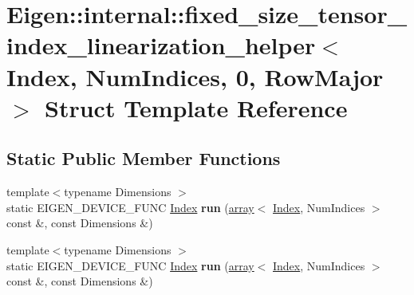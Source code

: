 \hypertarget{struct_eigen_1_1internal_1_1fixed__size__tensor__index__linearization__helper_3_01_index_00_01_n48be286421c8b3a07bb17ebfc895db83}{}\section{Eigen\+:\+:internal\+:\+:fixed\+\_\+size\+\_\+tensor\+\_\+index\+\_\+linearization\+\_\+helper$<$ Index, Num\+Indices, 0, Row\+Major $>$ Struct Template Reference}
\label{struct_eigen_1_1internal_1_1fixed__size__tensor__index__linearization__helper_3_01_index_00_01_n48be286421c8b3a07bb17ebfc895db83}
\subsection*{Static Public Member Functions}
\begin{DoxyCompactItemize}
\item 
\mbox{\label{struct_eigen_1_1internal_1_1fixed__size__tensor__index__linearization__helper_3_01_index_00_01_n48be286421c8b3a07bb17ebfc895db83_ab3589826fdcd68e98a31708d12753a07}} 
{\footnotesize template$<$typename Dimensions $>$ }\\static E\+I\+G\+E\+N\+\_\+\+D\+E\+V\+I\+C\+E\+\_\+\+F\+U\+NC \hyperlink{namespace_eigen_a62e77e0933482dafde8fe197d9a2cfde}{Index} {\bfseries run} (\hyperlink{class_eigen_1_1array}{array}$<$ \hyperlink{namespace_eigen_a62e77e0933482dafde8fe197d9a2cfde}{Index}, Num\+Indices $>$ const \&, const Dimensions \&)
\item 
\mbox{\label{struct_eigen_1_1internal_1_1fixed__size__tensor__index__linearization__helper_3_01_index_00_01_n48be286421c8b3a07bb17ebfc895db83_ab3589826fdcd68e98a31708d12753a07}} 
{\footnotesize template$<$typename Dimensions $>$ }\\static E\+I\+G\+E\+N\+\_\+\+D\+E\+V\+I\+C\+E\+\_\+\+F\+U\+NC \hyperlink{namespace_eigen_a62e77e0933482dafde8fe197d9a2cfde}{Index} {\bfseries run} (\hyperlink{class_eigen_1_1array}{array}$<$ \hyperlink{namespace_eigen_a62e77e0933482dafde8fe197d9a2cfde}{Index}, Num\+Indices $>$ const \&, const Dimensions \&)
\end{DoxyCompactItemize}


